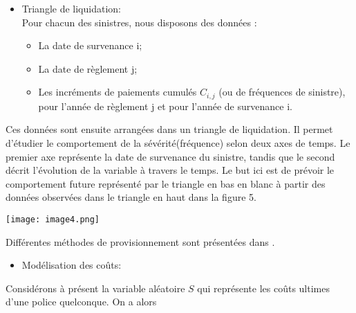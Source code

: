 \documentclass[11pt]{article}
\begin{document}
\begin{itemize}
\item Triangle de liquidation:\\

Pour chacun des sinistres, nous disposons des données :
\begin{itemize}
\item La date de survenance i;
\item La date de règlement j;
\item Les incréments de paiements cumulés $C_{i,j}$ (ou de fréquences de sinistre), pour l'année de règlement j et pour l'année de
survenance i.
\end{itemize}
\end{itemize}
Ces données sont ensuite arrangées dans un triangle de liquidation. Il permet d'étudier le comportement de la sévérité(fréquence) selon deux axes de temps. Le premier axe représente la date de survenance du sinistre, tandis que le second décrit l'évolution de la variable à travers le temps. Le but ici est de prévoir le comportement future représenté par le triangle en bas en blanc  à partir des données observées dans le triangle en haut dans la figure 5.
\begin{center}
\texttt{[image: image4.png]}
\end{center}
Différentes méthodes de provisionnement sont présentées dans \cite{charpentier2014computational}.\\

\begin{itemize}
\item Modélisation des coûts:
\end{itemize}
Considérons à présent la variable aléatoire $S$ qui représente les coûts ultimes d'une police quelconque. On a alors
\end{document}
